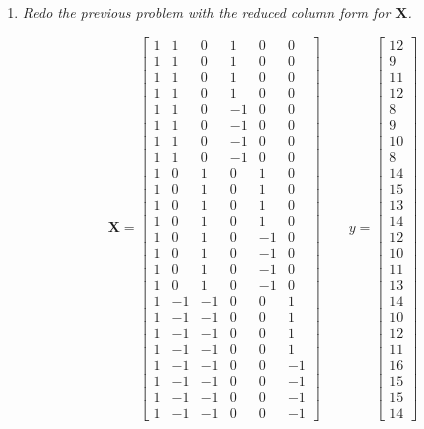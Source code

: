 \documentclass[11pt]{article}
\begin{document}
\begin{enumerate}
\pagebreak
\item %
{\it Redo the previous problem with the reduced column form for
 \(\mathbf{X}\).}

\begin{equation*}
\mathbf{X}=\begin{bmatrix}
1 & 1 & 0 & 1 & 0 & 0 \\
1 & 1 & 0 & 1 & 0 & 0 \\
1 & 1 & 0 & 1 & 0 & 0 \\
1 & 1 & 0 & 1 & 0 & 0 \\

1 & 1 & 0 & -1& 0 & 0 \\
1 & 1 & 0 & -1& 0 & 0 \\
1 & 1 & 0 & -1& 0 & 0 \\
1 & 1 & 0 & -1& 0 & 0 \\

1 & 0 & 1 & 0 & 1 & 0 \\
1 & 0 & 1 & 0 & 1 & 0 \\
1 & 0 & 1 & 0 & 1 & 0 \\
1 & 0 & 1 & 0 & 1 & 0 \\

1 & 0 & 1 & 0 & -1& 0 \\
1 & 0 & 1 & 0 & -1& 0 \\
1 & 0 & 1 & 0 & -1& 0 \\
1 & 0 & 1 & 0 & -1& 0 \\

1 & -1& -1& 0 & 0 & 1 \\
1 & -1& -1& 0 & 0 & 1 \\
1 & -1& -1& 0 & 0 & 1 \\
1 & -1& -1& 0 & 0 & 1 \\

1 & -1& -1& 0 & 0 & -1 \\
1 & -1& -1& 0 & 0 & -1 \\
1 & -1& -1& 0 & 0 & -1 \\
1 & -1& -1& 0 & 0 & -1
\end{bmatrix}\qquad y=\begin{bmatrix}
12 \\  9 \\ 11 \\ 12 \\
 8 \\  9 \\ 10 \\  8 \\
14 \\ 15 \\ 13 \\ 14 \\
12 \\ 10 \\ 11 \\ 13 \\
14 \\ 10 \\ 12 \\ 11 \\
16 \\ 15 \\ 15 \\ 14
\end{bmatrix}
\end{equation*}


\end{enumerate}
\end{document}

